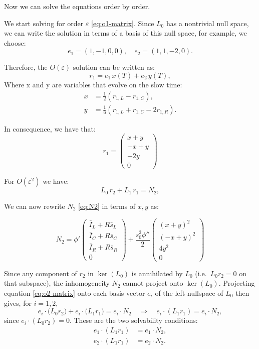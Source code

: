 \documentclass[../main.tex]{subfiles}
\begin{document}
\bigskip

Now we can solve the equations order by order.

We start solving for order $\varepsilon$ \eqref{eq:o1-matrix}. Since \(L_0\) has a nontrivial null space, we can write the solution in terms of a basis of this null space, for example, we choose:
\[
e_1 = (1, -1, 0, 0), \quad e_2 = (1, 1, -2, 0).
\]

Therefore, the $O(\varepsilon)$ solution can be written as:
\[
r_1 = e_1\,x(T) + e_2\,y(T),
\]
Where x and y are variables that evolve on the slow time:
\begin{equation}
\begin{aligned}
x &= \frac 12(r_{1,L}-r_{1,C}),\\
y &=  \frac 16 (r_{1,L}+r_{1,C}-2r_{1,R}).
\end{aligned}
\label{eq:x-y-definition}
\end{equation}


In consequence, we have that:
\begin{equation}
r_{1} = \begin{pmatrix}x+y\\-x+y\\-2y\\0 \end{pmatrix} 
\label{eq:r1-definition}
\end{equation}


For $O(\varepsilon^2)$ we have:
\begin{equation}
  L_0\,r_2 + L_1\,r_1 = N_2,
  \label{eq:o2-matrix}
\end{equation}

We can now rewrite $N_2$ \eqref{eq:N2} in terms of $x, y$ as:

\begin{equation}
N_2 = \phi'\begin{pmatrix}
\bar{I}_L + R\bar{s}_L  \\
\bar{I}_C  + R\bar{s}_C \\ 
\bar{I}_R + R\bar{s}_R \\ 
0
\end{pmatrix} + \frac{s_0^2 \phi''}{2} 
\begin{pmatrix}
(x +y)^2\\  
(-x + y)^2\\  
4y^2\\ 
0
\end{pmatrix}
\label{eq:N2-xy}
\end{equation}


Since any component of \(r_2\) in \(\ker(L_0)\) is annihilated by \(L_0\) (i.e.\ \(L_0r_2=0\) on that subspace), the inhomogeneity \(N_2\) cannot project onto \(\ker(L_0)\).  Projecting equation \eqref{eq:o2-matrix} onto each basis vector \(e_i\) of the left‐nullspace of \(L_0\) then gives, for \(i=1,2\),  
\[
e_i\cdot\bigl(L_0r_2\bigr) + e_i\cdot\bigl(L_1r_1\bigr)
= e_i\cdot\!N_2
\quad\Longrightarrow\quad
e_i\cdot\!(L_1r_1)=e_i\cdot\!N_2,
\]
since \(e_i\cdot(L_0r_2)=0\).  These are the two solvability conditions:
\[
\begin{aligned}
e_1\cdot(L_1r_1)&=e_1\cdot N_2,\\
e_2\cdot(L_1r_1)&=e_2\cdot N_2.
 \label{eq:solvability1}
\end{aligned}
\]
\end{document}
